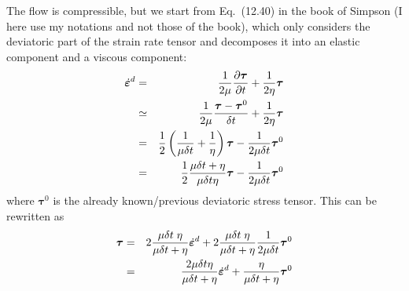 The flow is compressible, but 
we start from Eq.~(12.40) in the book of Simpson (I here use my notations
and not those of the book), which only considers the deviatoric part of the 
strain rate tensor and decomposes it into an elastic component and a viscous component:
\begin{eqnarray}
\dot{\bm\varepsilon}^d
&=&\frac{1}{2\mu} \frac{\partial \bm\tau}{\partial t}
+\frac{1}{2\eta} \bm\tau \nonumber\\
&\simeq&
\frac{1}{2\mu} \frac{\bm\tau - \bm\tau^0}{\delta t}
+\frac{1}{2\eta} \bm\tau \nonumber\\
&=&
\frac12 \left( \frac{1}{\mu \delta t} + \frac{1}{\eta} \right) {\bm\tau}
-\frac{1}{2\mu \delta t} \bm\tau^0\nonumber\\
&=&
\frac12 \frac{ \mu\delta t +\eta}{\mu \delta t \eta}  {\bm\tau}
-\frac{1}{2\mu \delta t} \bm\tau^0
\end{eqnarray}
where ${\bm \tau}^0$ is the already known/previous deviatoric stress tensor. This can be rewritten as
\begin{eqnarray}
\bm\tau 
&=&
2  \frac{\mu \delta t \; \eta}{ \mu\delta t +\eta} \dot{\bm\varepsilon}^d 
+
2 \frac{\mu \delta t \; \eta}{\mu\delta t + \eta} \frac{1}{2\mu \delta t} \bm\tau^0
\nonumber\\
&=&
\frac{2 \mu \delta t \eta}{ \mu\delta t +\eta} \dot{\bm\varepsilon}^d 
+
\frac{ \eta}{\mu\delta t + \eta}  \bm\tau^0 \label{tau_simp1}
\end{eqnarray}

